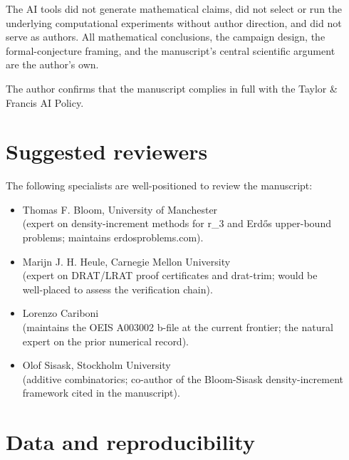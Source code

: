 \documentclass[
]{article}
\begin{document}
The AI tools did not generate mathematical claims, did not select or run
the\\
underlying computational experiments without author direction, and did
not\\
serve as authors. All mathematical conclusions, the campaign design,
the\\
formal-conjecture framing, and the manuscript's central scientific
argument\\
are the author's own.

The author confirms that the manuscript complies in full with the Taylor
\&\\
Francis AI Policy.

\section{Suggested reviewers}\label{suggested-reviewers}

The following specialists are well-positioned to review the manuscript:

\begin{itemize}
\item
  Thomas F. Bloom, University of Manchester\\
  (expert on density-increment methods for r\_3 and Erdős upper-bound\\
  problems; maintains erdosproblems.com).
\item
  Marijn J. H. Heule, Carnegie Mellon University\\
  (expert on DRAT/LRAT proof certificates and drat-trim; would be\\
  well-placed to assess the verification chain).
\item
  Lorenzo Cariboni\\
  (maintains the OEIS A003002 b-file at the current frontier; the
  natural\\
  expert on the prior numerical record).
\item
  Olof Sisask, Stockholm University\\
  (additive combinatorics; co-author of the Bloom-Sisask
  density-increment\\
  framework cited in the manuscript).
\end{itemize}

\section{Data and reproducibility}\label{data-and-reproducibility}
\end{document}
